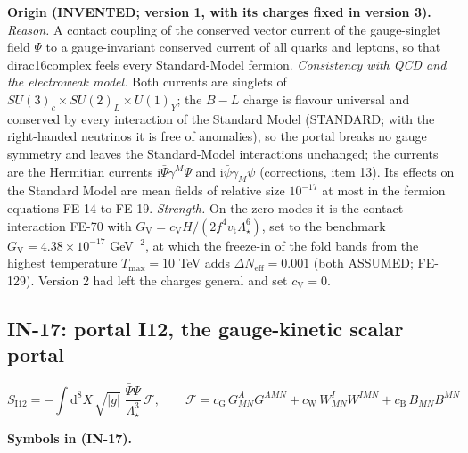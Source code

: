 \documentclass[
  10pt,
]{article}
\begin{document}
\textbf{Origin (INVENTED; version 1, with its charges fixed in version
3).} \emph{Reason.} A contact coupling of the conserved vector current
of the gauge-singlet field \(\Psi\) to a gauge-invariant conserved
current of all quarks and leptons, so that dirac16complex feels every
Standard-Model fermion. \emph{Consistency with QCD and the electroweak
model.} Both currents are singlets of
\(SU(3)_c\times SU(2)_L\times U(1)_Y\); the \(B - L\) charge is flavour
universal and conserved by every interaction of the Standard Model
(STANDARD; with the right-handed neutrinos it is free of anomalies), so
the portal breaks no gauge symmetry and leaves the Standard-Model
interactions unchanged; the currents are the Hermitian currents
\(\mathrm{i}\bar\Psi\gamma^M\Psi\) and
\(\mathrm{i}\bar\psi\gamma_M\psi\) (corrections, item 13). Its effects
on the Standard Model are mean fields of relative size \(10^{-17}\) at
most in the fermion equations FE-14 to FE-19. \emph{Strength.} On the
zero modes it is the contact interaction FE-70 with
\(G_{\mathrm{V}} = c_{\mathrm{V}}H/(2f^4v_{\mathrm{t}}\Lambda_\star^6)\),
set to the benchmark \(G_{\mathrm{V}} = 4.38\times10^{-17}\)
GeV\(^{-2}\), at which the freeze-in of the fold bands from the highest
temperature \(T_{\mathrm{max}} = 10\) TeV adds
\(\Delta N_{\mathrm{eff}} = 0.001\) (both ASSUMED; FE-129). Version 2
had left the charges general and set \(c_{\mathrm{V}} = 0\).

\hypertarget{in-17-portal-i12-the-gauge-kinetic-scalar-portal}{%
\subsection{IN-17: portal I12, the gauge-kinetic scalar
portal}\label{in-17-portal-i12-the-gauge-kinetic-scalar-portal}}

\[
S_{\mathrm{I12}} = -\int\mathrm{d}^8X\,\sqrt{\lvert
 g\rvert}\;\frac{\bar\Psi\Psi}{\Lambda_\star^3}\,\mathcal{F},\qquad
\mathcal{F} = c_{\mathrm{G}}\,G^A_{MN}G^{AMN} + c_{\mathrm{W}}\,W^I_{MN}W^{IMN} +
 c_{\mathrm{B}}\,B_{MN}B^{MN} \tag{IN-17}
\]

\textbf{Symbols in (IN-17).}
\end{document}
